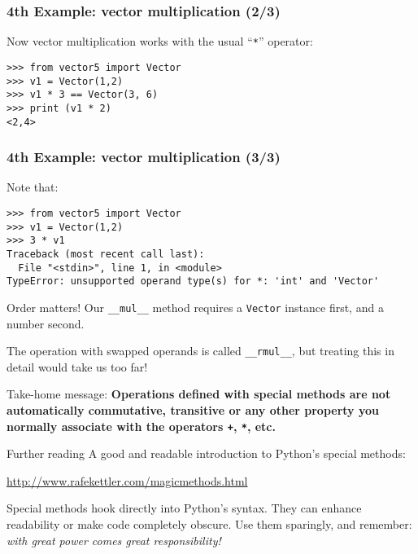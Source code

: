 \documentclass[english,serif,mathserif,xcolor=pdftex,dvipsnames,table]{beamer}
\begin{document}
\begin{frame}[fragile]
  \frametitle{4th Example: vector multiplication (2/3)}
  Now vector multiplication works with the usual ``\texttt{*}'' operator:
\begin{lstlisting}
>>> from vector5 import Vector
>>> v1 = Vector(1,2)
>>> v1 * 3 == Vector(3, 6)
>>> print (v1 * 2)
<2,4>
\end{lstlisting}
\end{frame}


\begin{frame}[fragile]
  \frametitle{4th Example: vector multiplication (3/3)}
  \small

  Note that:
\begin{lstlisting}[basicstyle=\ttfamily\scriptsize]
>>> from vector5 import Vector
>>> v1 = Vector(1,2)
>>> 3 * v1
Traceback (most recent call last):
  File "<stdin>", line 1, in <module>
TypeError: unsupported operand type(s) for *: 'int' and 'Vector'
\end{lstlisting}

  \+ Order matters! Our \lstinline|__mul__| method requires a \lstinline|Vector| instance first, and a number second.

  \+ The operation with swapped operands is called \lstinline|__rmul__|, but treating this in detail would take us too far!

  \+ Take-home message: \textbf{Operations defined with special
    methods are not automatically commutative, transitive or any other
    property you normally associate with the operators \texttt{+},
    \texttt{*}, etc.}
\end{frame}


\begin{frame}{Further reading}
  A good and readable introduction to Python's special methods:
  \begin{center}
    \url{http://www.rafekettler.com/magicmethods.html}
  \end{center}

  \+
  Special methods hook directly into Python's syntax.  They can
  enhance readability or make code completely obscure.  Use them
  sparingly, and remember: \emph{with great power comes great
    responsibility!}
\end{frame}
\end{document}
